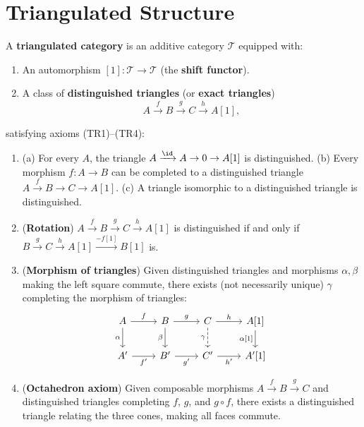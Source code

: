 \section{Triangulated Structure}\label{sec:triangulated}

\begin{definition}\label{def:triangulated-cat}
A \textbf{triangulated category} is an additive category $\mathcal{T}$ equipped with:
\begin{enumerate}
    \item An automorphism $[1] \colon \mathcal{T} \to \mathcal{T}$ (the \textbf{shift functor}).
    \item A class of \textbf{distinguished triangles} (or \textbf{exact triangles})
    \[
        A \xrightarrow{f} B \xrightarrow{g} C \xrightarrow{h} A[1],
    \]
\end{enumerate}
satisfying axioms (TR1)--(TR4):
\begin{enumerate}
    \item[(TR1)] (a) For every $A$, the triangle $A \xrightarrow{\id} A \to 0 \to A[1]$ is
    distinguished. (b) Every morphism $f \colon A \to B$ can be completed to a distinguished
    triangle $A \xrightarrow{f} B \to C \to A[1]$. (c) A triangle isomorphic to a
    distinguished triangle is distinguished.
    \item[(TR2)] (\textbf{Rotation})
    $A \xrightarrow{f} B \xrightarrow{g} C \xrightarrow{h} A[1]$ is distinguished
    if and only if $B \xrightarrow{g} C \xrightarrow{h} A[1] \xrightarrow{-f[1]} B[1]$ is.
    \item[(TR3)] (\textbf{Morphism of triangles}) Given distinguished triangles and morphisms
    $\alpha, \beta$ making the left square commute, there exists (not necessarily unique)
    $\gamma$ completing the morphism of triangles:
    \[
    \begin{tikzcd}
        A \arrow[r, "f"] \arrow[d, "\alpha"'] & B \arrow[r, "g"] \arrow[d, "\beta"']
        & C \arrow[r, "h"] \arrow[d, dashed, "\gamma"'] & A{[1]} \arrow[d, "\alpha{[1]}"'] \\
        A' \arrow[r, "f'"'] & B' \arrow[r, "g'"'] & C' \arrow[r, "h'"'] & A'{[1]}
    \end{tikzcd}
    \]
    \item[(TR4)] (\textbf{Octahedron axiom})
    Given composable morphisms $A \xrightarrow{f} B \xrightarrow{g} C$ and distinguished
    triangles completing $f$, $g$, and $g \circ f$, there exists a distinguished triangle
    relating the three cones, making all faces commute.
\end{enumerate}
\end{definition}


